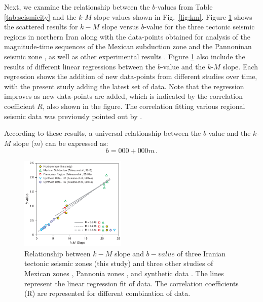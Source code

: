 Next, we examine the relationship between the $b$-values from Table \ref{tab:seismicity} and the $k$-$M$ slope values shown in Fig.~\ref{fig:km}. Figure \ref{fig:regression} shows the scattered results for $k-M$ slope versus $b$-value for the three tectonic seismic regions in northern Iran along with the data-points obtained for analysis of the magnitude-time sequences of the Mexican subduction zone \citep{Telesca2013} and the Pannoninan seismic zone \citep{Telesca2014}, as well as other experimental results \citep{Telesca2014-pone}. Figure \ref{fig:regression} also include the results of different linear regressions between the $b$-value and the $k$-$M$ slope. Each regression shows the addition of new data-points from different studies over time, with the present study adding the latest set of data. Note that the regression improves as new data-points are added, which is indicated by the correlation coefficient $R$, also shown in the figure. The correlation fitting various regional seismic data was previously pointed out by \citet{Telesca2014}. 

According to these results, a universal relationship between the $b$-value and the $k$-$M$ slope ($m$) can be expressed as:
% 
\begin{equation}
	b = 000 + 000 m \, .
	\label{eq:universal.bm}
\end{equation}

\begin{figure}[h]%
	\centering
	\includegraphics[width=0.45\textwidth]{figures/pdf/figure-07} 
	\caption{Relationship between $k-M$ slope and $b-value$ of three Iranian tectonic seismic zones (this study) and three other studies of Mexican zones \citep{Telesca2013}, Pannonia zones \citep{Telesca2014}, and synthetic data \citep{Telesca2014-pone}. The lines represent the linear regression fit of data. The correlation coefficients (R) are represented for different combination of data.}
	\label{fig:regression}
\end{figure}

